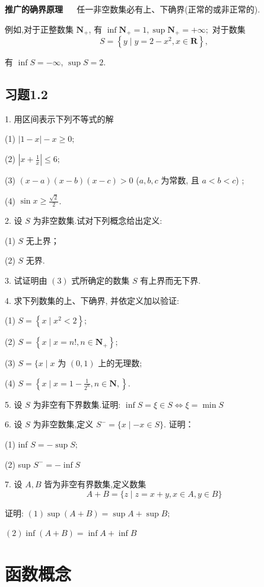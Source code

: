 \textbf{推广的确界原理} $\quad$ 任一非空数集必有上、下确界(正常的或非正常的).

例如,对于正整数集 $\mathbf{N}_{+}$, 有 $\inf \mathbf{N}_{+}=1, \sup \mathbf{N}_{+}=+\infty ;$ 对于数集
\[
S=\left\{y \mid y=2-x^{2}, x \in \mathbf{R}\right\} , \tag{3}
\]

有 $\inf S=-\infty$, $\sup S=2$.

\subsection{习题1.2}

1. 用区间表示下列不等式的解

(1) $|1-x|-x \geqslant 0;$

(2) $\left|x+\frac{1}{x}\right| \leqslant 6 ;$

(3) $(x-a)(x-b)(x-c)>0$ ($a, b, c$ 为常数, 且 $a<b<c$) ;

(4) $\sin x \geqslant \frac{\sqrt{2}}{2}$.

2. 设 $S$ 为非空数集.试对下列概念给出定义:

(1) $S$ 无上界；

(2) $S$ 无界.

3. 试证明由 $(3)$ 式所确定的数集 $S$ 有上界而无下界.

4. 求下列数集的上、下确界, 并依定义加以验证:

(1) $S=\left\{x \mid x^{2}<2\right\};$

(2) $S=\left\{x \mid x=n !, n \in \mathbf{N}_{+}\right\};$

(3) $S=\{x \mid x$ 为 $(0,1)$ 上的无理数;

(4) $S=\left\{x \mid x=1-\frac{1}{2^{n}}, n \in \mathbf{N},\right\} .$

5. 设 $S$ 为非空有下界数集.证明:
$\inf S=\xi \in S \Leftrightarrow \xi=\min S$

6. 设 $S$ 为非空数集,定义 $S^{-}=\{x \mid -x \in S\} .$ 证明：

(1) inf $S=-\sup S ;$

(2) sup $S^{-}=-\inf S$

7. 设 $A, B$ 皆为非空有界数集,定义数集
\[A+B=\{z \mid z=x+y, x \in A, y \in B\}\]

证明: $(1) \sup (A+B)=\sup A+\sup B;$

$(2) \inf (A+B)=\inf A+\inf B$

\section{函数概念}

